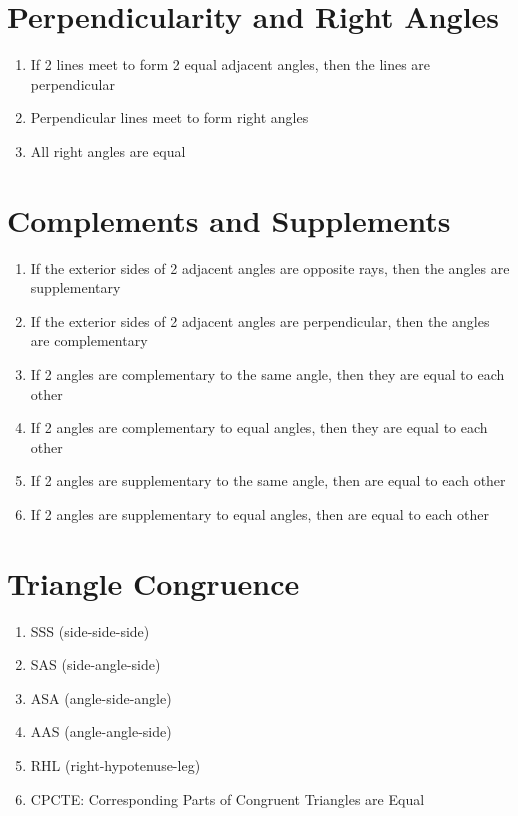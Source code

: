 \section*{Perpendicularity and Right Angles}
\begin{enumerate}
    \item If 2 lines meet to form 2 equal adjacent angles, then the lines are perpendicular
    \item Perpendicular lines meet to form right angles
    \item All right angles are equal
\end{enumerate}

\section*{Complements and Supplements}
\begin{enumerate}
    \item If the exterior sides of 2 adjacent angles are opposite rays, then the angles are supplementary
    \item If the exterior sides of 2 adjacent angles are perpendicular, then the angles are complementary
    \item If 2 angles are complementary to the same angle, then they are equal to each other
    \item If 2 angles are complementary to equal angles, then they are equal to each other
    \item If 2 angles are supplementary to the same angle, then are equal to each other
    \item If 2 angles are supplementary to equal angles, then are equal to each other
\end{enumerate}

\section*{Triangle Congruence}
\begin{enumerate}
    \item SSS (side-side-side)
    \item SAS (side-angle-side)
    \item ASA (angle-side-angle)
    \item AAS (angle-angle-side)
    \item RHL (right-hypotenuse-leg)
    \item CPCTE: Corresponding Parts of Congruent Triangles are Equal
\end{enumerate}

